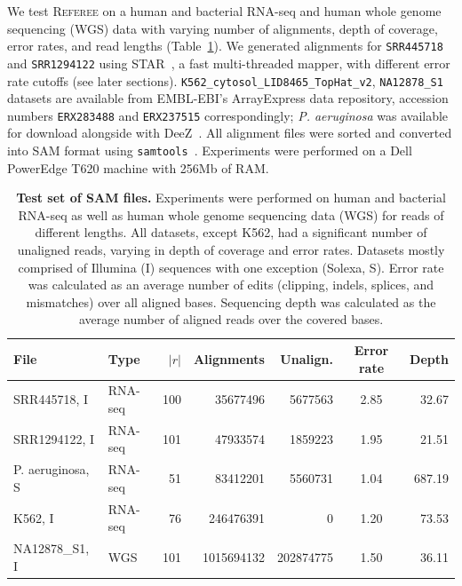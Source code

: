 \documentclass[12pt]{cmuthesis}
\newcommand{\refer}{\textsc{Referee}\xspace}
\begin{document}

  We test \refer on a human and bacterial RNA-seq and human whole genome sequencing (WGS) data with varying number of alignments, depth of coverage, error rates, and read lengths (Table~\ref{tab:datasets}). We generated alignments for \texttt{SRR445718} and \texttt{SRR1294122} using STAR~\cite{DobinSTAR}, a fast multi-threaded mapper, with different error rate cutoffs (see later sections).
  \texttt{K562\_cytosol\_LID8465\_TopHat\_v2}, \texttt{NA12878\_S1} datasets are available from EMBL-EBI's ArrayExpress data repository, accession numbers \texttt{ERX283488} and \texttt{ERX237515} correspondingly;
  \textit{P. aeruginosa} was available for download alongside with DeeZ~\cite{Sahinalp2015}. All alignment files were sorted and converted into SAM format using \texttt{samtools}~\cite{SamTools}. Experiments were performed on a Dell PowerEdge T620 machine with 256Mb of RAM.

  \begin{table}[ht!]
    \caption{\textbf{Test set of SAM files.} Experiments were performed on human and bacterial RNA-seq as well as human whole genome sequencing data (WGS) for reads of different lengths. All datasets, except K562, had a significant number of unaligned reads, varying in depth of coverage and error rates. Datasets mostly comprised of Illumina (I) sequences with one exception (Solexa, S). Error rate was calculated as an average number of edits (clipping, indels, splices, and mismatches) over all aligned bases. Sequencing depth was calculated as the average number of aligned reads over the covered bases.}
    \label{tab:datasets}
    \centering
    \begin{tabular}{l l r r r c r}
    \toprule
    File 			& Type 		& $|r|$ & Alignments & Unalign. & Error rate & Depth \\
    \midrule
    SRR445718, I		& RNA-seq & 100 & 35677496 & 5677563 & 2.85 & 32.67 \\
    SRR1294122, I 		& RNA-seq	& 101 & 47933574 & 1859223 & 1.95 & 21.51 \\
    P. aeruginosa, S 	& RNA-seq	& 51  & 83412201 & 5560731 & 1.04 & 687.19 \\
    K562, I 			& RNA-seq	& 76  & 246476391 & 0 & 1.20 & 73.53 \\
    NA12878\_S1, I 	& WGS 	& 101 & 1015694132 & 202874775 & 1.50 & 36.11 \\
    \bottomrule
    \end{tabular}
  \end{table}
\end{document}
